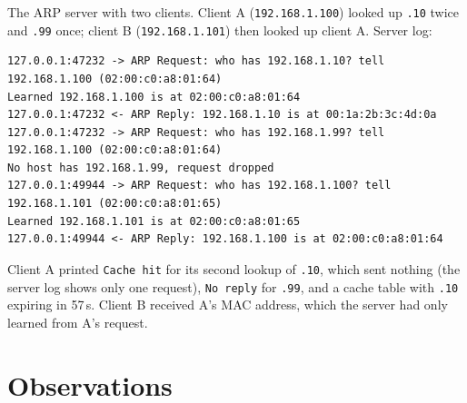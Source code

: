 \documentclass[11pt,a4paper]{article}
\begin{document}
The ARP server with two clients. Client A (\texttt{192.168.1.100}) looked up
\texttt{.10} twice and \texttt{.99} once; client B (\texttt{192.168.1.101}) then
looked up client A. Server log:

\begin{lstlisting}[style=plain]
127.0.0.1:47232 -> ARP Request: who has 192.168.1.10? tell 192.168.1.100 (02:00:c0:a8:01:64)
Learned 192.168.1.100 is at 02:00:c0:a8:01:64
127.0.0.1:47232 <- ARP Reply: 192.168.1.10 is at 00:1a:2b:3c:4d:0a
127.0.0.1:47232 -> ARP Request: who has 192.168.1.99? tell 192.168.1.100 (02:00:c0:a8:01:64)
No host has 192.168.1.99, request dropped
127.0.0.1:49944 -> ARP Request: who has 192.168.1.100? tell 192.168.1.101 (02:00:c0:a8:01:65)
Learned 192.168.1.101 is at 02:00:c0:a8:01:65
127.0.0.1:49944 <- ARP Reply: 192.168.1.100 is at 02:00:c0:a8:01:64
\end{lstlisting}

Client A printed \texttt{Cache hit} for its second lookup of \texttt{.10},
which sent nothing (the server log shows only one request), \texttt{No reply}
for \texttt{.99}, and a cache table with \texttt{.10} expiring in 57\,s. Client B
received A's MAC address, which the server had only learned from A's request.

\section{Observations}
\end{document}
